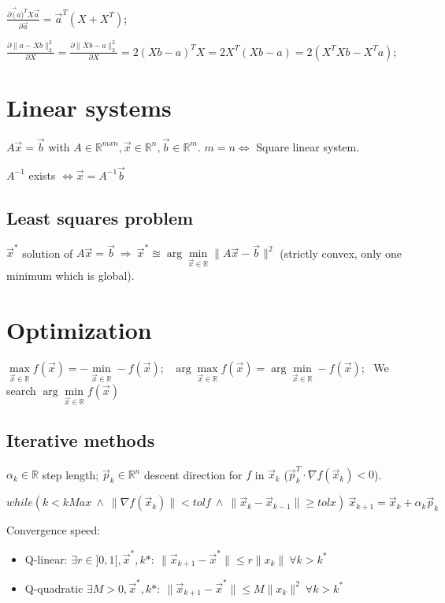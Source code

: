 \documentclass[]{article}
\begin{document}
	$\frac{\partial \vec(a)^T X \vec{a}}{\partial \vec{a}} = \vec{a}^T (X + X^T)$;
	
	$\frac{\partial \lVert a-Xb\rVert_2^2}{\partial X} = \frac{\partial \lVert Xb-a\rVert_2^2}{\partial X} = 2(Xb-a)^T X = 2 X^T (Xb-a) = 2(X^T X b - X^T a)$;

	\section{Linear systems}
	
	$A\vec{x} = \vec{b}$ with $A \in \mathbb{R}^{mxn}, \vec{x} \in \mathbb{R}^n, \vec{b} \in \mathbb{R}^m$.
	$m=n \Leftrightarrow$ Square linear system.
	
	$A^{-1}$ exists $\iff \vec{x} = A^{-1} \vec{b}$
	
	\subsection{Least squares problem}
	
	$\vec{x}^*$ solution of $A \vec{x} = \vec{b} \ \Rightarrow \ \vec{x}^* \approxeq \arg\min\limits_{\vec{x}\in \mathbb{R}}\lVert A \vec{x} - \vec{b} \rVert^2$ (strictly convex, only one minimum which is global).
	
	\section{Optimization}
	
	$\max\limits_{\vec{x}\in\mathbb{R}} f(\vec{x}) = -\min\limits_{\vec{x}\in\mathbb{R}} -f(\vec{x})$; \ 
	$\arg\max\limits_{\vec{x}\in\mathbb{R}} f(\vec{x}) = \arg\min\limits_{\vec{x}\in\mathbb{R}} -f(\vec{x})$; \ 
	We search $\arg\min\limits_{\vec{x}\in\mathbb{R}} f(\vec{x})$
	
	\subsection{Iterative methods}
	
	$\alpha_k \in \mathbb{R}$ step length; $\vec{p}_k \in \mathbb{R}^n$ descent direction for $f$ in $\vec{x}_k$ ($\vec{p}_k^T \cdot \nabla f(\vec{x}_k) < 0$).
	
	$while ( k < kMax \ \land \ \lVert \nabla f(\vec{x}_k) \rVert < tolf \ \land \ \lVert \vec{x}_k - \vec{x}_{k-1} \rVert \ge tolx ) \  \vec{x}_{k+1} = \vec{x}_k + \alpha_k \vec{p}_k$
	
	Convergence speed:
	\begin{itemize}
		\item Q-linear: $\exists r\in]0,1[, \vec{x}^*, k*: \  \lVert \vec{x}_{k+1}-\vec{x}^* \rVert \le r \lVert x_k \rVert \ \forall k > k^*$
		\item Q-quadratic $\exists M>0, \vec{x}^*, k*: \  \lVert \vec{x}_{k+1}-\vec{x}^* \rVert \le M \lVert x_k \rVert^2 \ \forall k > k^*$
	\end{itemize}
	
\end{document}
